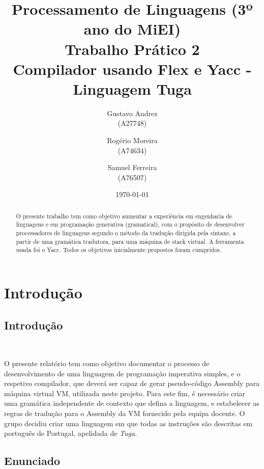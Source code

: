 \documentclass{report}
\title{Processamento de Linguagens (3º ano do MiEI)\\ \textbf{Trabalho Prático 2}\\ Compilador usando Flex e Yacc - Linguagem Tuga}
\author{Gustavo Andrez\\ (A27748) \and Rogério Moreira\\ (A74634) \and Samuel Ferreira\\ (A76507) }
\date{\today}
\begin{document}
\maketitle

\begin{abstract}

O presente trabalho tem como objetivo aumentar a experiência em engenharia de linguagens e em programação generativa (gramatical), com o propósito de desenvolver processadores de linguagens segundo o método da tradução dirigida pela sintaxe, a partir de uma gramática tradutora, para uma máquina de stack virtual.
A ferramenta usada foi o Yacc. Todos os objetivos inicialmente propostos foram cumpridos.

\end{abstract}

\tableofcontents

\chapter{Introdu\c{c}\~ao} \label{intro}

\section*{Introdu\c{c}\~ao} \

O presente relatório tem como objetivo documentar o processo de desenvolvimento de uma linguagem de programação imperativa simples, e o respetivo compilador, que deverá ser capaz de gerar pseudo-código Assembly para máquina virtual VM, utilizada neste projeto. Para este fim, é necessário criar uma gramática independente de contexto que defina a linguagem, e estabelecer as regras de tradução para o Assembly da VM fornecido pela equipa docente.
O grupo decidiu criar uma linguagem em que todas as instruções são descritas em português de Portugal, apelidada de \emph{Tuga}. 

\section*{Enunciado} \
\end{document}
